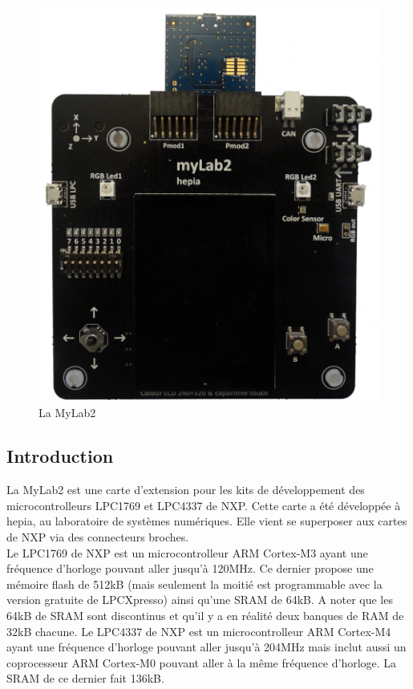 \documentclass[a4paper]{article}
\begin{document}
\begin{figure}[!h]
  \centering
  \includegraphics[scale=0.3]{images/mylab2.png}
  \caption{La MyLab2}
\end{figure}

\subsection{Introduction}
La MyLab2 est une carte d'extension pour les kits de développement des microcontrolleurs
LPC1769 et LPC4337 de NXP. Cette carte a été développée à hepia, au laboratoire
de systèmes numériques. Elle vient se superposer aux cartes de NXP via des connecteurs
broches. \\

Le LPC1769 de NXP est un microcontrolleur ARM Cortex-M3 ayant une fréquence d'horloge
pouvant aller jusqu'à 120MHz. Ce dernier propose une mémoire flash de 512kB (mais
seulement la moitié est programmable avec la version gratuite de LPCXpresso) ainsi
qu'une SRAM de 64kB. A noter que les 64kB de SRAM sont discontinus et qu'il y a en
réalité deux banques de RAM de 32kB chacune. 
Le LPC4337 de NXP est un microcontrolleur ARM Cortex-M4 ayant une fréquence d'horloge 
pouvant aller jusqu'à 204MHz mais inclut aussi un coprocesseur ARM Cortex-M0 pouvant
aller à la même fréquence d'horloge. La SRAM de ce dernier fait 136kB. \\
\end{document}
